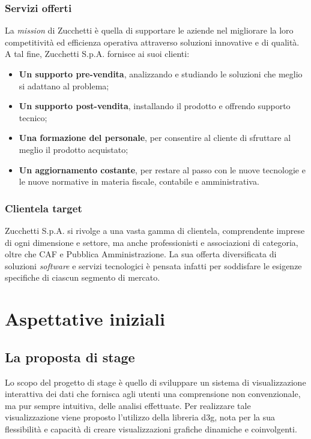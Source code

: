 \subsubsection{Servizi offerti}
La \emph{mission} di Zucchetti è quella di supportare le aziende nel migliorare
la loro competitività ed efficienza operativa attraverso soluzioni innovative e 
di qualità.
A tal fine, Zucchetti S.p.A. fornisce ai suoi clienti:
\begin{itemize}
    \item \textbf{Un supporto pre-vendita}, analizzando e studiando le soluzioni 
    che meglio si adattano al problema;
    \item \textbf{Un supporto post-vendita}, installando il prodotto e 
    offrendo supporto tecnico;
    \item \textbf{Una formazione del personale}, per consentire al cliente di 
    sfruttare al meglio il prodotto acquistato;
    \item \textbf{Un aggiornamento costante}, per restare al passo con le nuove
    tecnologie e le nuove normative in materia fiscale, contabile e amministrativa.
\end{itemize} 

\subsubsection{Clientela target}
Zucchetti S.p.A. si rivolge a una vasta gamma di clientela, comprendente imprese
di ogni dimensione e settore, ma anche professionisti e associazioni di categoria, 
oltre che CAF e Pubblica Amministrazione. 
La sua offerta diversificata di soluzioni \emph{software} e servizi tecnologici è pensata 
infatti per soddisfare le esigenze specifiche di ciascun segmento di mercato.



\section{Aspettative iniziali}
\subsection{La proposta di stage}
Lo scopo del progetto di stage è quello di sviluppare un sistema di visualizzazione interattiva dei dati che 
fornisca agli utenti una comprensione non convenzionale, ma pur sempre intuitiva, delle analisi effettuate. 
Per realizzare tale visualizzazione viene proposto l'utilizzo della libreria \gls{d3g}, nota per la 
sua flessibilità e capacità di creare visualizzazioni grafiche dinamiche e coinvolgenti.

